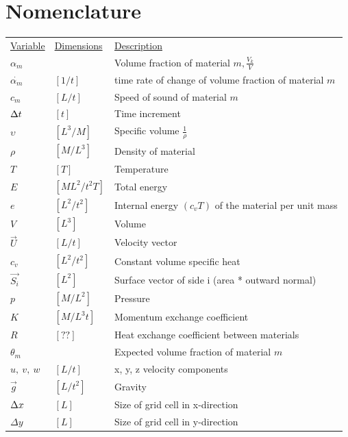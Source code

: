 \documentclass[fleqn]{article}
\begin{document}
\section{\textsf{Nomenclature}}
\begin{tabular}{lll}
\\
\underline{\textsf{Variable}} & \underline{\textsf{Dimensions}} & \underline{\textsf{Description} }\\
$\alpha_m$      &           &    Volume fraction of material $m, \frac{V_k}{V}$\\
$\dot{\alpha_m}$&$[1/t]$    &    time rate of change of volume fraction of material $m$\\
$c_m$         &  $[L/t]$    &    Speed of sound of material $m$\\
$\delt$       &  $[t]$      &    Time increment\\
$\upsilon$    &  $[L^3/M]$  &    Specific volume $\frac{1}{\rho}$\\
$\rho$        &  $[M/L^3]$  &     Density of material\\
$T$           &  $[T]$      &    Temperature\\
$E$           &  $[ML^2/t^2T]$&  Total energy \\
$e$           &  $[L^2/t^2]$ &   Internal energy $(c_vT)$ of the material per unit mass \\   
$V$           &  $[L^3]$    &    Volume\\ 
$\vec{U}$     &  $[L/t]$    &    Velocity vector\\
$c_v$         &  $[L^2/t^2]$&   Constant volume specific heat\\
$\vec{S_i}$   &  $[L^2]$    &    Surface vector of side i (area * outward normal)\\
$p$           &  $[M/L^2]$ &     Pressure\\
$K$           &  $[M/L^3t]$ &    Momentum exchange coefficient\\
$R$           &  $[??]$     &    Heat exchange coefficient between materials\\
$\theta_m$    &             &    Expected volume fraction of material $m$\\
$u,~v,~w$     &  $[L/t]$    &    x, y, z velocity components\\
$\vec{g}$     &  $[L/t^2]$  &    Gravity \\
$\delx$       &  $[L]$      &    Size of grid cell in x-direction\\
$\Delta{y}$   &  $[L]$      &    Size of grid cell in y-direction\\

\end{tabular}
\end{document}
